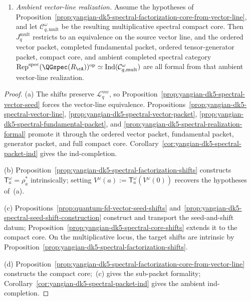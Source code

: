 \begin{corollary}
\begin{enumerate}[label=\textup{(\alph*)}]
\item\emph{Ambient vector-line realization.}
  Assume the hypotheses of
  Proposition~\ref{prop:yangian-dk5-spectral-factorization-core-from-vector-line},
  and let \(\mathcal C_{q,\mathrm{mult}}^\omega\) be the resulting
  multiplicative spectral compact core.  Then \(J_q^{\mathrm{mult}}\)
  restricts to an equivalence on the source vector line, and the
  ordered vector packet, completed fundamental packet, ordered
  tensor-generator packet, compact core, and ambient completed spectral
  category
  \(\operatorname{Rep}^{\mathrm{spec}}(\QGspec(R_{\cA}))^{\mathrm{op}}
  \simeq
  \operatorname{Ind}(\mathcal C_{q,\mathrm{mult}}^\omega)\)
  are all formal from that ambient vector-line realization.
\end{enumerate}
\end{corollary}

\begin{proof}
\textup{(a)}
The shifts preserve \(\mathcal{L}^{\mathrm{vec}}_{q}\), so
Proposition~\ref{prop:yangian-dk5-spectral-vector-seed} forces the
vector-line equivalence.
Propositions~\ref{prop:yangian-dk5-spectral-vector-line},
\ref{prop:yangian-dk5-spectral-vector-packet},
\ref{prop:yangian-dk5-spectral-fundamental-packet}, and
\ref{prop:yangian-dk5-spectral-realization-formal}
promote it through the ordered vector packet,
fundamental packet, generator packet, and full compact core.
Corollary~\ref{cor:yangian-dk5-spectral-packet-ind} gives the
ind-completion.

\textup{(b)}
Proposition~\ref{prop:yangian-dk5-spectral-factorization-shifts}
constructs \(\mathsf T_a^\omega=\rho_a^*\) intrinsically; setting
\(V^\omega(a):=\mathsf T_a^\omega(V^\omega(0))\) recovers the
hypotheses of~\textup{(a)}.

\textup{(c)}
Propositions~\ref{prop:quantum-fd-vector-seed-shifts}
and~\ref{prop:yangian-dk5-spectral-seed-shift-construction} construct
and transport the seed-and-shift datum;
Proposition~\ref{prop:yangian-dk5-spectral-core-shifts} extends it to
the compact core.  On the multiplicative locus, the target shifts are
intrinsic by
Proposition~\ref{prop:yangian-dk5-spectral-factorization-shifts}.

\textup{(d)}
Proposition~\ref{prop:yangian-dk5-spectral-factorization-core-from-vector-line}
constructs the compact core;~\textup{(c)} gives the sub-packet
formality; Corollary~\ref{cor:yangian-dk5-spectral-packet-ind} gives
the ambient ind-completion.
\end{proof}

